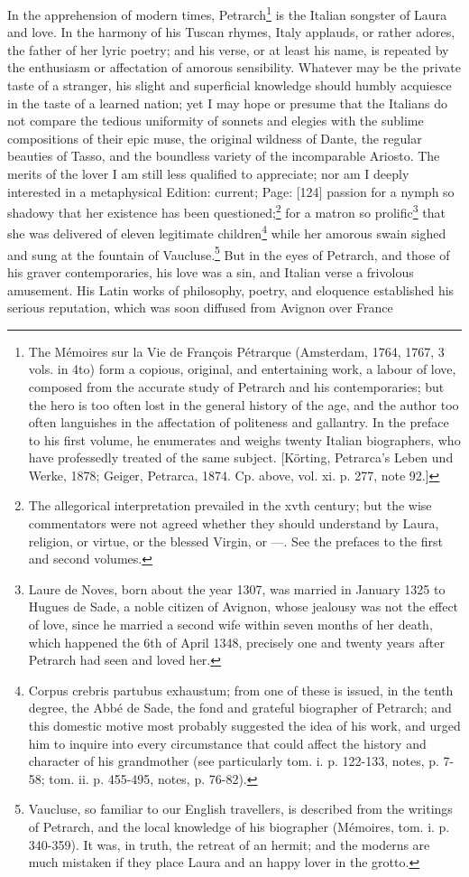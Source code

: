 In the apprehension of modern times, Petrarch\footnote{The Mémoires sur la Vie de François Pétrarque (Amsterdam, 1764, 1767, 3 vols. in 4to) form a copious, original, and entertaining work, a labour of love, composed from the accurate study of Petrarch and his contemporaries; but the hero is too often lost in the general history of the age, and the author too often languishes in the affectation of politeness and gallantry. In the preface to his first volume, he enumerates and weighs twenty Italian biographers, who have professedly treated of the same subject. [Körting, Petrarca\texthebrew{}’s Leben und Werke, 1878; Geiger, Petrarca, 1874. Cp. above, vol. xi. p. 277, note 92.]} is the Italian songster of Laura and love. In the harmony of his Tuscan rhymes, Italy applauds, or rather adores, the father of her lyric poetry; and his verse, or at least his name, is repeated by the enthusiasm or affectation of amorous sensibility. Whatever may be the private taste of a stranger, his slight and superficial knowledge should humbly acquiesce in the taste of a learned nation; yet I may hope or presume that the Italians do not compare the tedious uniformity of sonnets and elegies with the sublime compositions of their epic muse, the original wildness of Dante, the regular beauties of Tasso, and the boundless variety of the incomparable Ariosto. The merits of the lover I am still less qualified to appreciate; nor am I deeply interested in a metaphysical Edition: current; Page: [124] passion for a nymph so shadowy that her existence has been questioned;\footnote{The allegorical interpretation prevailed in the xvth century; but the wise commentators were not agreed whether they should understand by Laura, religion, or virtue, or the blessed Virgin, or \texthebrew{—}. See the prefaces to the first and second volumes.} for a matron so prolific\footnote{Laure de Noves, born about the year 1307, was married in January 1325 to Hugues de Sade, a noble citizen of Avignon, whose jealousy was not the effect of love, since he married a second wife within seven months of her death, which happened the 6th of April 1348, precisely one and twenty years after Petrarch had seen and loved her.} that she was delivered of eleven legitimate children\footnote{Corpus crebris partubus exhaustum; from one of these is issued, in the tenth degree, the Abbé de Sade, the fond and grateful biographer of Petrarch; and this domestic motive most probably suggested the idea of his work, and urged him to inquire into every circumstance that could affect the history and character of his grandmother (see particularly tom. i. p. 122-133, notes, p. 7-58; tom. ii. p. 455-495, notes, p. 76-82).} while her amorous swain sighed and sung at the fountain of Vaucluse.\footnote{Vaucluse, so familiar to our English travellers, is described from the writings of Petrarch, and the local knowledge of his biographer (Mémoires, tom. i. p. 340-359). It was, in truth, the retreat of an hermit; and the moderns are much mistaken if they place Laura and an happy lover in the grotto.} But in the eyes of Petrarch, and those of his graver contemporaries, his love was a sin, and Italian verse a frivolous amusement. His Latin works of philosophy, poetry, and eloquence established his serious reputation, which was soon diffused from Avignon over France 